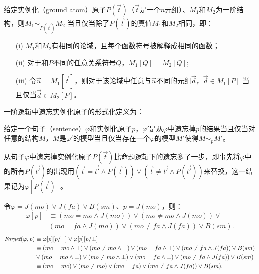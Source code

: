 给定实例化（ground atom）原子$P(\vec{t})$（$\vec{t}$是一个$n$元组）、$M_1$和$M_2$为一阶结构，则$M_1 \sim_{P(\vec{t})} M_2$ 当且仅当除了$P(\vec{t})$的真值$M_1$和$M_2$相同，即：
\begin{itemize}
	\item[(i)] $M_1$和$M_2$有相同的论域，且每个函数符号被解释成相同的函数；
	\item[(ii)] 对于和$P$不同的任意关系符号$Q$，$M_1[Q]=M_2[Q]$;
	\item[(iii)] 令$\vec{u} = M_1[\vec{t}]$，则对于该论域中任意与$\vec{u}$不同的元组$\vec{d}$，$\vec{d} \in M_1[P]$ 当且仅当$\vec{d} \in M_2[P]$。
\end{itemize}

一阶逻辑中遗忘实例化原子的形式化定义\cite{lin1994forget}为：
\begin{definition}\label{def:fol_fogetting}
	给定一个句子（sentence）$\varphi$和实例化原子$p$，$\varphi'$是从$\varphi$中遗忘掉$p$的结果当且仅当对任意的结构$M$，$M$是$\varphi'$的模型当且仅当存在一个$\varphi$的模型$M'$使得$M \sim_p M'$。
\end{definition}

从句子$\varphi$中遗忘掉实例化原子$P(\vec{t})$比命题逻辑下的遗忘多了一步，即事先将$\varphi$中的所有$P(\vec{t'})$的出现用$(\vec{t
} = \vec{t'}\wedge P(\vec{t})) \vee (\vec{t} \not= \vec{t'}\wedge P(\vec{t'}))$来替换，这一结果记为$\varphi[P(\vec{t})]$。

\begin{example}
	令$\varphi=J(mo) \vee J(fa) \vee B(sm)$、$p = J(mo)$，则：
	\begin{align*}
		\varphi[p] & \equiv (mo = mo \wedge J(mo)) \vee (mo \not = mo \wedge J(mo)) \vee \\
		& (mo = fa \wedge J(mo)) \vee (mo \not = fa \wedge J(fa)) \vee B(sm).
	\end{align*}
	\begin{align*}
		\textit{Forget}(\varphi, p) & \equiv \varphi[p][p/\top] \vee \varphi[p][p/\bot]\\
		& \equiv  (mo = mo \wedge \top) \vee (mo \not = mo \wedge \top) \vee  (mo = fa \wedge \top) \vee (mo \not = fa \wedge J(fa)) \vee B(sm) \\
		&\vee (mo = mo \wedge \bot) \vee (mo \not = mo \wedge \bot) \vee  (mo = fa \wedge \bot) \vee (mo \not = fa \wedge J(fa)) \vee B(sm)\\
		& \equiv (mo = mo )\vee (mo \not = mo) \vee  (mo = fa ) \vee  (mo \not = fa \wedge J(fa)) \vee B(sm).
	\end{align*}
\end{example}

